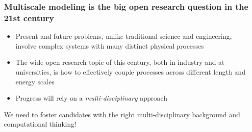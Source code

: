 \documentclass{beamer}
\begin{document}
\begin{frame}
\frametitle{Multiscale modeling is the big open research question in the 21st century}

\begin{block}{}
\begin{itemize}
\item Present and future problems, unlike traditional science and engineering, involve complex systems with many distinct physical processes

\item The wide open research topic of this century, both in industry and at universities, is how to effectively couple processes across different length and energy scales

\item Progress will rely on a \emph{multi-disciplinary} approach
\end{itemize}

\noindent
\end{block}

\begin{block}{}
We need to foster candidates with the right
multi-disciplinary background and computational thinking!
\end{block}
\end{frame}
\end{document}
